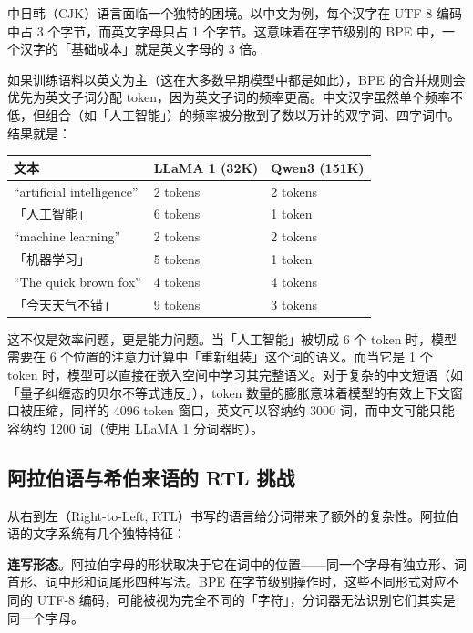 中日韩（CJK）语言面临一个独特的困境。以中文为例，每个汉字在 UTF-8 编码中占 3 个字节，而英文字母只占 1 个字节。这意味着在字节级别的 BPE 中，一个汉字的「基础成本」就是英文字母的 3 倍。

如果训练语料以英文为主（这在大多数早期模型中都是如此），BPE 的合并规则会优先为英文子词分配 token，因为英文子词的频率更高。中文汉字虽然单个频率不低，但组合（如「人工智能」）的频率被分散到了数以万计的双字词、四字词中。结果就是：

\begin{center}\small
\renewcommand{\arraystretch}{1.3}
\begin{tabular}{lll}
\toprule
\rowcolor{figLightGray}
\textbf{文本} & \textbf{LLaMA 1 (32K)} & \textbf{Qwen3 (151K)} \\
\midrule
“artificial intelligence” & 2 tokens & 2 tokens \\
「人工智能」                  & 6 tokens & 1 token \\
“machine learning”         & 2 tokens & 2 tokens \\
「机器学习」                  & 5 tokens & 1 token \\
“The quick brown fox”      & 4 tokens & 4 tokens \\
「今天天气不错」              & 9 tokens & 3 tokens \\
\bottomrule
\end{tabular}
\end{center}

这不仅是效率问题，更是能力问题。当「人工智能」被切成 6 个 token 时，模型需要在 6 个位置的注意力计算中「重新组装」这个词的语义。而当它是 1 个 token 时，模型可以直接在嵌入空间中学习其完整语义。对于复杂的中文短语（如「量子纠缠态的贝尔不等式违反」），token 数量的膨胀意味着模型的有效上下文窗口被压缩，同样的 4096 token 窗口，英文可以容纳约 3000 词，而中文可能只能容纳约 1200 词（使用 LLaMA 1 分词器时）。

\subsection{阿拉伯语与希伯来语的 RTL 挑战}

从右到左（Right-to-Left, RTL）书写的语言给分词带来了额外的复杂性。阿拉伯语的文字系统有几个独特特征：

\textbf{连写形态}。阿拉伯字母的形状取决于它在词中的位置——同一个字母有独立形、词首形、词中形和词尾形四种写法。BPE 在字节级别操作时，这些不同形式对应不同的 UTF-8 编码，可能被视为完全不同的「字符」，分词器无法识别它们其实是同一个字母。

